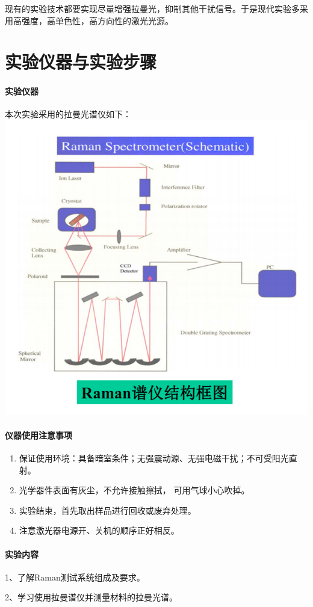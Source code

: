 \documentclass[hyperref]{ctexart}
\begin{document}
\begin{multicols}{2}
		
		现有的实验技术都要实现尽量增强拉曼光，抑制其他干扰信号。于是现代实验多采用高强度，高单色性，高方向性的激光光源。
		
		\section{实验仪器与实验步骤}
		\paragraph{实验仪器}
		本次实验采用的拉曼光谱仪如下：
		\includegraphics[width = 0.75\linewidth]{Spectrometer_stru.png}
		\paragraph{仪器使用注意事项}
		\begin{enumerate}
			\item	保证使用环境：具备暗室条件；无强震动源、无强电磁干扰；不可受阳光直射。
			\item	光学器件表面有灰尘，不允许接触擦拭，
			可用气球小心吹掉。
			\item	实验结束，首先取出样品进行回收或废弃处理。
			\item	注意激光器电源开、关机的顺序正好相反。
		\end{enumerate}
		\paragraph{实验内容}
		
		1、了解Raman测试系统组成及要求。
		
		2、学习使用拉曼谱仪并测量材料的拉曼光谱。
		

\end{multicols}
\end{document}
